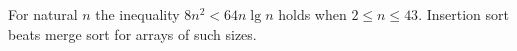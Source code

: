 For natural $n$ the inequality $8n^2<64n\lg n$ holds when $2\le n\le43$.
Insertion sort beats merge sort for arrays of such sizes.
